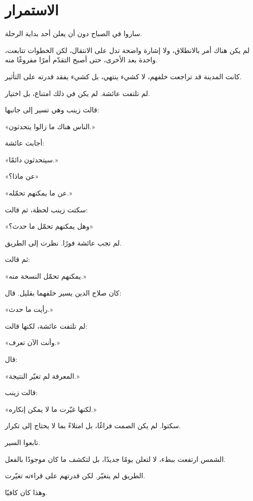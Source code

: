 
\chapter*{{\AmiriFont الاستمرار}}

{{\AmiriFont


ساروا في الصباح دون أن يعلن أحد بداية الرحلة.

لم يكن هناك أمر بالانطلاق، ولا إشارة واضحة تدل على الانتقال،
لكن الخطوات تتابعت، واحدة بعد الأخرى، حتى أصبح التقدّم
أمرًا مفروغًا منه.

كانت المدينة قد تراجعت خلفهم، لا كشيء ينتهي، بل كشيء
يفقد قدرته على التأثير.

لم تلتفت عائشة. لم يكن في ذلك امتناع، بل اختيار.

قالت زينب وهي تسير إلى جانبها:

«الناس هناك ما زالوا يتحدثون.»

أجابت عائشة:

«سيتحدثون دائمًا.»

«عن ماذا؟»

«عن ما يمكنهم تحمّله.»

سكتت زينب لحظة، ثم قالت:

«وهل يمكنهم تحمّل ما حدث؟»

لم تجب عائشة فورًا. نظرت إلى الطريق.

ثم قالت:

«يمكنهم تحمّل النسخة منه.»

كان صلاح الدين يسير خلفهما بقليل. قال:

«رأيت ما حدث.»

لم تلتفت عائشة، لكنها قالت:

«وأنت الآن تعرف.»

قال:

«المعرفة لم تغيّر النتيجة.»

قالت زينب:

«لكنها غيّرت ما لا يمكن إنكاره.»

سكتوا. لم يكن الصمت فراغًا، بل امتلاءً بما لا يحتاج إلى تكرار.

تابعوا السير.

الشمس ارتفعت ببطء، لا لتعلن يومًا جديدًا، بل لتكشف ما كان موجودًا بالفعل.

الطريق لم يتغيّر. لكن قدرتهم على قراءته تغيّرت.

وهذا كان كافيًا.

}}
